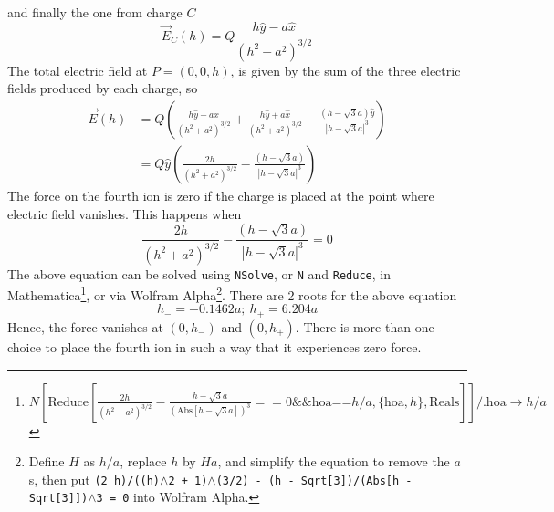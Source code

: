 \documentclass{esg8022pset}
\begin{document}
\begin{solution}
\begin{align*}
  \end{align*}
  and finally the one from charge $C$
  \begin{equation*}
    \vec E_C(h) = Q\frac{h\hat y - a\hat x}{(h^2 + a^2)^{3/2}}
  \end{equation*}
  The total electric field at $P = (0, 0, h)$, is given by the sum of the three electric fields produced by each charge, so
  \begin{align*}
    \vec E(h) & = Q\left(\frac{h\hat y - a\hat x}{(h^2 + a^2)^{3/2}} + \frac{h\hat y + a\hat x}{(h^2 + a^2)^{3/2}} - \frac{(h - \sqrt3 a)\hat y}{|h - \sqrt3 a|^3}\right) \\
              & = Q\hat y\left(\frac{2h}{(h^2 + a^2)^{3/2}} - \frac{(h - \sqrt3 a)}{|h - \sqrt3 a|^3}\right)
  \end{align*}
  The force on the fourth ion is zero if the charge is placed at the point where electric field vanishes. This happens when
  \begin{equation*}
    \frac{2h}{(h^2 + a^2)^{3/2}} - \frac{(h - \sqrt3 a)}{|h - \sqrt3 a|^3} = 0
  \end{equation*}
  The above equation can be solved using \texttt{NSolve}, or \texttt{N} and \texttt{Reduce}, in Mathematica\footnote{$N\left[\text{Reduce}\left[\frac{2 h}{\left(h^2+a^2\right)^{3/2}}-\frac{h-\sqrt{3}a}{\left(\text{Abs}\left[h-\sqrt{3}a\right]\right)^3}==0\&\&\text{hoa}\text{==}h/ a,\{\text{hoa},h\},\text{Reals}\right]\right]\text{/.}\text{hoa}\to h/a$}, or via Wolfram Alpha\footnote{Define $H$ as $h / a$, replace $h$ by $H a$, and simplify the equation to remove the $a$s, then put \texttt{(2 h)/((h)$\wedge$2 + 1)$\wedge$(3/2) - (h - Sqrt[3])/(Abs[h - Sqrt[3]])$\wedge$3 = 0} into Wolfram Alpha.}. There are 2 roots for the above equation
  $$h_- = -0.1462a;\ h_+ = 6.204a$$
  Hence, the force vanishes at $(0, h_-)$ and $(0, h_+)$. There is more than one choice to place the fourth ion in such a way that it experiences zero force.
\end{solution}
\end{document}
